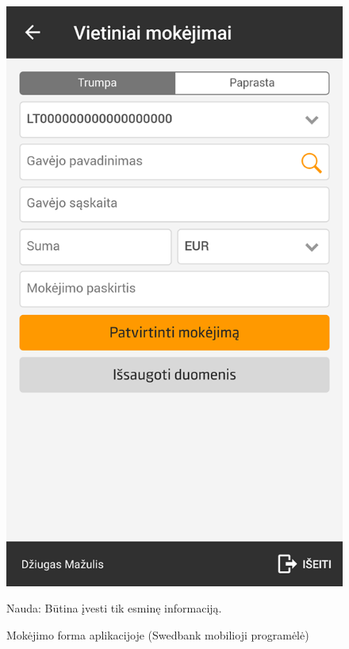 \documentclass{VUMIFPSkursinis}
\begin{document}
\begin{figure}[!htb]
	\begin{center}
	\includegraphics[scale=0.4]{mobileAppPaymentForm.png}
	\end{center}
  \caption{Mokėjimo forma aplikacijoje (Swedbank mobilioji programėlė)}
	\label{fig:mobileAppPaymentForm}
	Nauda: Būtina įvesti tik esminę informaciją.
\end{figure}
\end{document}
